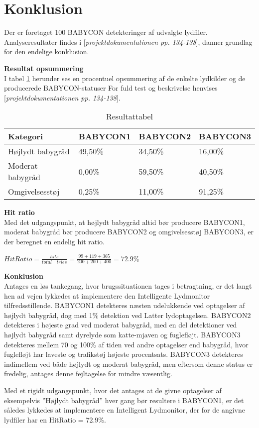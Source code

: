 \newpage
\section{Konklusion}
Der er foretaget 100 BABYCON detekteringer af udvalgte lydfiler. Analyseresultater findes i [\textit{projektdokumentationen pp. 134-138}], danner grundlag for den endelige konklusion. 

\textbf{Resultat opsummering}\\
I tabel \ref{IL:result} herunder ses en procentuel opsummering af de enkelte lydkilder og de producerede BABYCON-statuser 
For fuld test og beskrivelse henvises [\textit{projektdokumentationen pp. 134-138}].

\begin{table}[!htbp] \centering
	\caption{Resultattabel}
	\label{IL:result}
	\begin{tabular}{|l|l|l|l|}
	\hline
		\textbf{Kategori} & \textbf{BABYCON1} & \textbf{BABYCON2} & \textbf{BABYCON3}\\\hline
		Højlydt babygråd & 49,50\% & 34,50\% & 16,00\% \\\hline
		Moderat babygråd & 0,00\% & 59,50\% & 40,50\% \\\hline
		Omgivelsesstøj & 0,25\% & 11,00\% & 91,25\% \\\hline
	\end{tabular}
\end{table}

\textbf{Hit ratio}\\
Med det udgangspunkt, at højlydt babygråd altid bør producere BABYCON1, moderat babygråd bør producere BABYCON2 og omgivelsesstøj BABYCON3, er der beregnet en endelig hit ratio. 
\begin{center}
$HitRatio=\frac { hits }{ total\quad tries } =\frac { 99+119+365 }{ 200+200+400 } =72.9$\%
\end{center}

\textbf{Konklusion}\\
Antages en løs tankegang, hvor brugssituationen tages i betragtning, er det langt hen ad
vejen lykkedes at implementere den Intelligente Lydmonitor tilfredsstillende. BABYCON1
detekteres næsten udelukkende ved optagelser af højlydt babygråd, dog med 1\% detektion ved
Latter lydoptagelsen. BABYCON2 detekteres i højeste grad ved moderat babygråd, med
en del detektioner ved højlydt babygråd samt dyrelyde som katte-mjaven og fuglefløjt.
BABYCON3 detekteres mellem 70 og 100\% af tiden ved andre optagelser end babygråd,
hvor fuglefløjt har laveste og trafikstøj højeste procentsats. BABYCON3 detekteres
indimellem ved både højlydt og moderat babygråd, men eftersom denne status er fredelig,
antages denne fejltagelse for mindre væsentlig.

Med et rigidt udgangspunkt, hvor det antages at de givne optagelser af eksempelvis
”Højlydt babygråd” hver gang bør resultere i BABYCON1, er det således lykkedes at implementere
en Intelligent Lydmonitor, der for de angivne lydfiler har en HitRatio = 72.9\%.




 
